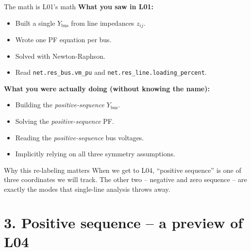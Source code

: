 \documentclass[aspectratio=169,10pt]{beamer}
\newcommand{\code}[1]{\texttt{#1}}
\begin{document}
\begin{frame}{The math is L01's math}
\textbf{What you saw in L01:}
\begin{itemize}
  \item Built a single $Y_{\text{bus}}$ from line impedances $z_{ij}$.
  \item Wrote one PF equation per bus.
  \item Solved with Newton-Raphson.
  \item Read \code{net.res\_bus.vm\_pu} and \code{net.res\_line.loading\_percent}.
\end{itemize}
\vspace{0.3em}
\textbf{What you were actually doing (without knowing the name):}
\begin{itemize}
  \item Building the \emph{positive-sequence} $Y_{\text{bus}}$.
  \item Solving the \emph{positive-sequence} PF.
  \item Reading the \emph{positive-sequence} bus voltages.
  \item Implicitly relying on all three symmetry assumptions.
\end{itemize}
\vspace{0.4em}
\begin{alertblock}{Why this re-labeling matters}
When we get to L04, ``positive sequence'' is one of three coordinates we will track. The other two -- negative and zero sequence -- are exactly the modes that single-line analysis throws away.
\end{alertblock}
\end{frame}

\section*{3. Positive sequence -- a preview of L04}
\end{document}
